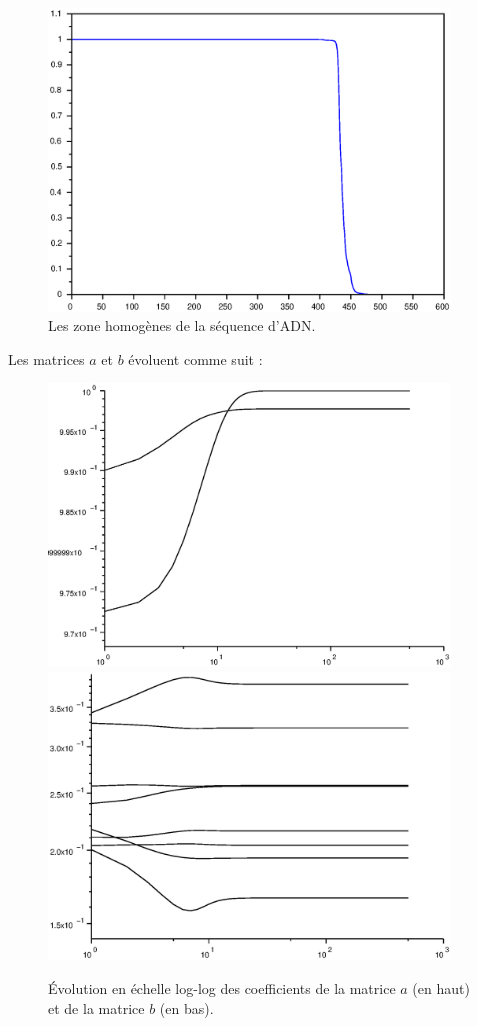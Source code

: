 \documentclass[12pt,a4paper]{article}
\begin{document}
\begin{figure}[H]
	\centering
	\includegraphics[width=0.95\textwidth]{images/figure3.eps}
	\caption{Les zone homogènes de la séquence d'\textsc{ADN}.}
\end{figure}

Les matrices $a$ et $b$ évoluent comme suit :

\begin{figure}[H]
	\centering
	\includegraphics[width=0.95\textwidth]{images/figure4.eps}\\
	\includegraphics[width=0.95\textwidth]{images/figure5.eps}
	\caption{Évolution en échelle log-log des coefficients de la matrice $a$ (en haut) et de la matrice $b$ (en bas).}
\end{figure}
\end{document}

